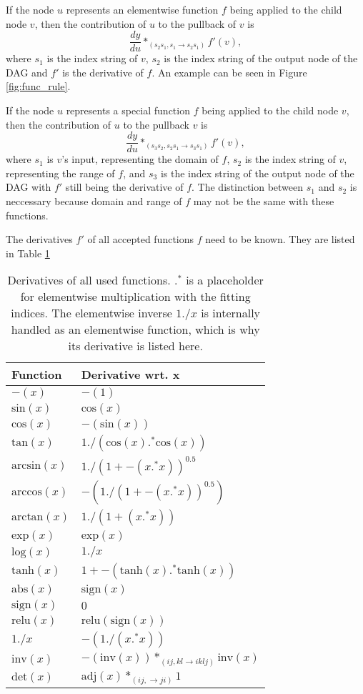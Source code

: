 \documentclass[12pt, a4paper]{report}
\begin{document}
If the node $u$ represents an elementwise function $f$ being applied to the child node $v$, then the contribution of $u$ to the pullback of $v$ is 
$$
\frac{dy}{du} *_{(s_2s_1,s_1 \rightarrow s_2s_1)} f'(v),
$$
where $s_1$ is the index string of $v$, $s_2$ is the index string of the output node of the DAG and $f'$ is the derivative of $f$.
An example can be seen in Figure \ref{fig:func_rule}.

If the node $u$ represents a special function $f$ being applied to the child node $v$, then the contribution of $u$ to the pullback $v$ is
$$
\frac{dy}{du} *_{(s_3s_2,s_2s_1 \rightarrow s_3s_1)} f'(v),
$$
where $s_1$ is $v$'s input, representing the domain of $f$, $s_2$ is the index string of $v$, representing the range of $f$, and $s_3$ is the index string of the output node of the DAG with $f'$ still being the derivative of $f$.
The distinction between $s_1$ and $s_2$ is neccessary because domain and range of $f$ may not be the same with these functions.

The derivatives $f'$ of all accepted functions $f$ need to be known.
They are listed in Table \ref{tab:func_diffs}
\begin{table}[ht]
    \centering
    \begin{tabular}{l | l}
        Function & Derivative wrt. x \\\hline
        $-(x)$ & $-(1)$ \\
        $\text{sin}(x)$ & $\text{cos}(x)$ \\
        $\text{cos}(x)$ & $-(\text{sin}(x))$ \\
        $\text{tan}(x)$ & $1 ./ (\text{cos}(x) .^* \text{cos}(x))$ \\
        $\text{arcsin}(x)$ & $1 ./ (1 + -(x .^* x))^{0.5}$ \\
        $\text{arccos}(x)$ & $-(1 ./ (1 + -(x .^* x))^{0.5})$ \\
        $\text{arctan}(x)$ & $1 ./ (1 + (x .^* x))$ \\
        $\text{exp}(x)$ & $\text{exp}(x)$ \\
        $\text{log}(x)$ & $1 ./ x$ \\
        $\text{tanh}(x)$ & $1 + -(\text{tanh}(x) .^* \text{tanh}(x))$ \\
        $\text{abs}(x)$ & $\text{sign}(x)$ \\
        $\text{sign}(x)$ & $0$ \\
        $\text{relu}(x)$ & $\text{relu}(\text{sign}(x))$ \\
        $1 ./ x$ & $- (1 ./ (x .^* x))$ \\
        $\text{inv}(x)$ & $-(\text{inv}(x)) *_{(ij,kl \rightarrow iklj)} \text{inv}(x)$ \\
        $\text{det}(x)$ & $\text{adj}(x) *_{(ij, \rightarrow ji)} 1$ \\
    \end{tabular}
    \caption{Derivatives of all used functions. $.^*$ is a placeholder for elementwise multiplication with the fitting indices. The elementwise inverse $1 ./ x$ is internally handled as an elementwise function, which is why its derivative is listed here.}
    \label{tab:func_diffs}
\end{table}
\end{document}
